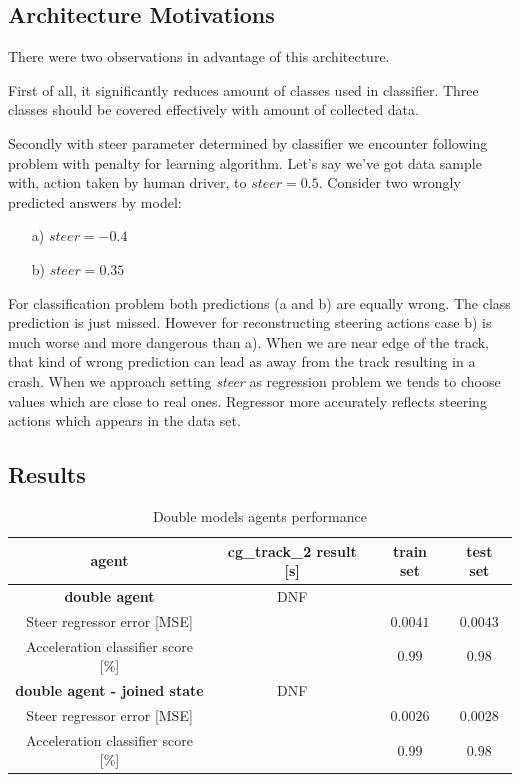\documentclass[declaration,shortabstract,english,inz]{iithesis}
\begin{document}
\subsection{Architecture Motivations}

There were two observations in advantage of this architecture.


First of all, it significantly reduces amount of classes used in classifier.
Three classes should be covered effectively with amount of collected data.

Secondly with steer parameter determined by classifier we encounter following problem with penalty for learning algorithm.
Let's say we've got data sample with, action taken by human driver, to $steer=0.5$.
Consider two wrongly predicted answers by model:
\begin{itemize}
    \item[a)] $steer=-0.4$
    \item[b)] $steer=0.35$
\end{itemize}

For classification problem both predictions (a and b) are equally wrong.
 The class prediction is just missed.
However for reconstructing steering actions case b) is much worse and more dangerous than a).
When we are near edge of the track, that kind of wrong prediction can lead as away from the track resulting in a crash.
When we approach setting \textit{steer} as regression problem we tends to choose values which are close to real ones.
Regressor more accurately reflects steering actions which appears in the data set.

\subsection{Results}

\begin{table}[h]
    \centering
    \begin{tabular}{ |c|c|c|c|}
          \hline
          agent & cg\_track\_2 result [s] & train set & test set \\
          \hline
          \textbf{double agent} & DNF &   &  \\
          \hline
          Steer regressor error [MSE]&   & $0.0041$ & $0.0043$\\
          \hline
          Acceleration classifier score [\%]&  & $0.99$ & $0.98$ \\
          \hline
          \textbf{double agent - joined state} & DNF &   &  \\
          \hline
          Steer regressor error [MSE]&   & $0.0026$ & $0.0028$\\
          \hline
          Acceleration classifier score [\%]&  & $0.99$ & $0.98$ \\
          \hline
          
        \end{tabular}
        \caption{Double models agents performance}
        \label{tab:double_models_results}

\end{table}
\end{document}
